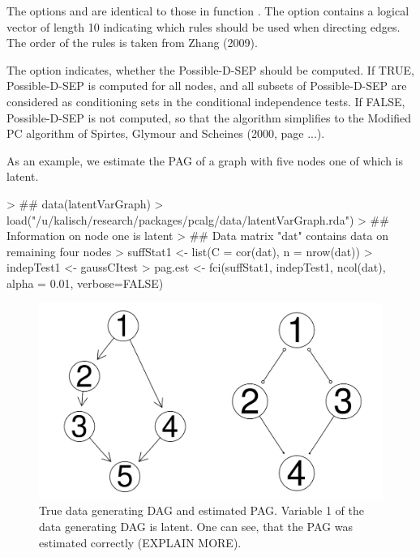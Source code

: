 \documentclass[article]{jss}
\begin{document}
The options  and  are identical to those in function
. The option  contains a logical vector of
length 10 indicating which rules should be used when directing edges. The
order of the rules is taken from Zhang (2009).
     
The option  indicates, whether the Possible-D-SEP should be
computed. If TRUE, Possible-D-SEP is computed for all nodes, and all
subsets of Possible-D-SEP are considered as conditioning sets in the
conditional independence tests. If FALSE, Possible-D-SEP is not computed,
so that the algorithm simplifies to the Modified PC algorithm of Spirtes,
Glymour and Scheines (2000, page ...).
     
As an example, we estimate the PAG of a graph with five nodes one of which
is latent.
\begin{Schunk}
\begin{Sinput}
> ## data(latentVarGraph)
> load("/u/kalisch/research/packages/pcalg/data/latentVarGraph.rda")
> ## Information on node one is latent
> ## Data matrix "dat" contains data on remaining four nodes
> suffStat1 <- list(C = cor(dat), n = nrow(dat))
> indepTest1 <- gaussCItest 
> pag.est <- fci(suffStat1, indepTest1, ncol(dat), alpha = 0.01, verbose=FALSE)
\end{Sinput}
\end{Schunk}

\begin{figure}
  \begin{center}
\includegraphics{pcalgDoc-013}
\caption{True data generating DAG and estimated PAG. Variable 1 of the data
generating DAG is latent. One can see, that the PAG was estimated correctly
(EXPLAIN MORE).}
\label{fig:fci}
\end{center}
\end{figure}
\end{document}
